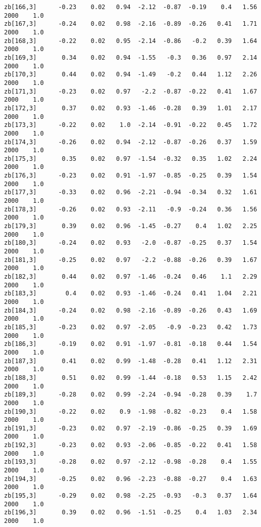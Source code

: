 \documentclass[11pt]{article}
\begin{document}
\begin{Verbatim}[commandchars=\\\{\}]
zb[166,3]      -0.23    0.02   0.94  -2.12  -0.87  -0.19    0.4   1.56   2000    1.0
zb[167,3]      -0.24    0.02   0.98  -2.16  -0.89  -0.26   0.41   1.71   2000    1.0
zb[168,3]      -0.22    0.02   0.95  -2.14  -0.86   -0.2   0.39   1.64   2000    1.0
zb[169,3]       0.34    0.02   0.94  -1.55   -0.3   0.36   0.97   2.14   2000    1.0
zb[170,3]       0.44    0.02   0.94  -1.49   -0.2   0.44   1.12   2.26   2000    1.0
zb[171,3]      -0.23    0.02   0.97   -2.2  -0.87  -0.22   0.41   1.67   2000    1.0
zb[172,3]       0.37    0.02   0.93  -1.46  -0.28   0.39   1.01   2.17   2000    1.0
zb[173,3]      -0.22    0.02    1.0  -2.14  -0.91  -0.22   0.45   1.72   2000    1.0
zb[174,3]      -0.26    0.02   0.94  -2.12  -0.87  -0.26   0.37   1.59   2000    1.0
zb[175,3]       0.35    0.02   0.97  -1.54  -0.32   0.35   1.02   2.24   2000    1.0
zb[176,3]      -0.23    0.02   0.91  -1.97  -0.85  -0.25   0.39   1.54   2000    1.0
zb[177,3]      -0.33    0.02   0.96  -2.21  -0.94  -0.34   0.32   1.61   2000    1.0
zb[178,3]      -0.26    0.02   0.93  -2.11   -0.9  -0.24   0.36   1.56   2000    1.0
zb[179,3]       0.39    0.02   0.96  -1.45  -0.27    0.4   1.02   2.25   2000    1.0
zb[180,3]      -0.24    0.02   0.93   -2.0  -0.87  -0.25   0.37   1.54   2000    1.0
zb[181,3]      -0.25    0.02   0.97   -2.2  -0.88  -0.26   0.39   1.67   2000    1.0
zb[182,3]       0.44    0.02   0.97  -1.46  -0.24   0.46    1.1   2.29   2000    1.0
zb[183,3]        0.4    0.02   0.93  -1.46  -0.24   0.41   1.04   2.21   2000    1.0
zb[184,3]      -0.24    0.02   0.98  -2.16  -0.89  -0.26   0.43   1.69   2000    1.0
zb[185,3]      -0.23    0.02   0.97  -2.05   -0.9  -0.23   0.42   1.73   2000    1.0
zb[186,3]      -0.19    0.02   0.91  -1.97  -0.81  -0.18   0.44   1.54   2000    1.0
zb[187,3]       0.41    0.02   0.99  -1.48  -0.28   0.41   1.12   2.31   2000    1.0
zb[188,3]       0.51    0.02   0.99  -1.44  -0.18   0.53   1.15   2.42   2000    1.0
zb[189,3]      -0.28    0.02   0.99  -2.24  -0.94  -0.28   0.39    1.7   2000    1.0
zb[190,3]      -0.22    0.02    0.9  -1.98  -0.82  -0.23    0.4   1.58   2000    1.0
zb[191,3]      -0.23    0.02   0.97  -2.19  -0.86  -0.25   0.39   1.69   2000    1.0
zb[192,3]      -0.23    0.02   0.93  -2.06  -0.85  -0.22   0.41   1.58   2000    1.0
zb[193,3]      -0.28    0.02   0.97  -2.12  -0.98  -0.28    0.4   1.55   2000    1.0
zb[194,3]      -0.25    0.02   0.96  -2.23  -0.88  -0.27    0.4   1.63   2000    1.0
zb[195,3]      -0.29    0.02   0.98  -2.25  -0.93   -0.3   0.37   1.64   2000    1.0
zb[196,3]       0.39    0.02   0.96  -1.51  -0.25    0.4   1.03   2.34   2000    1.0

\end{Verbatim}
\end{document}
